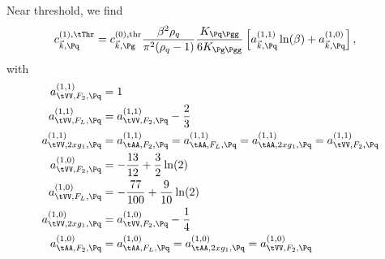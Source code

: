 Near threshold, we find
\begin{align}
c_{\vec k,\Pq}^{(1),\tThr} &= c_{\vec k,\Pg}^{(0),\text{thr}} \frac{\beta^2\rho_q}{\pi^2(\rho_q-1)} \frac{K_{\Pq\Pgg}}{6K_{\Pg\Pgg}} \left[a_{\vec k,\Pq}^{(1,1)}\ln(\beta) + a_{\vec k,\Pq}^{(1,0)}\right],
\end{align}
with
\begin{align}
a^{(1,1)}_{\tVV,F_2,\Pq} &= 1\\
a^{(1,1)}_{\tVV,F_L,\Pq} &= a^{(1,1)}_{\tVV,F_2,\Pq} - \frac 2 {3}\\
a^{(1,1)}_{\tVV,2xg_1,\Pq} &= a^{(1,1)}_{\tAA,F_2,\Pq} = a^{(1,1)}_{\tAA,F_L,\Pq} = a^{(1,1)}_{\tAA,2xg_1,\Pq}= a^{(1,1)}_{\tVV,F_2,\Pq}\\
a^{(1,0)}_{\tVV,F_2,\Pq} &= -\frac{13}{12} + \frac 3 2 \ln(2)\\
a^{(1,0)}_{\tVV,F_L,\Pq} &= -\frac{77}{100} + \frac 9 {10} \ln(2) \\
a^{(1,0)}_{\tVV,2xg_1,\Pq} &= a^{(1,0)}_{\tVV,F_2,\Pq} - \frac{1}{4}\\
a^{(1,0)}_{\tAA,F_2,\Pq} &= a^{(1,0)}_{\tAA,F_L,\Pq} = a^{(1,0)}_{\tAA,2xg_1,\Pq}= a^{(1,0)}_{\tVV,F_2,\Pq}
\end{align}
